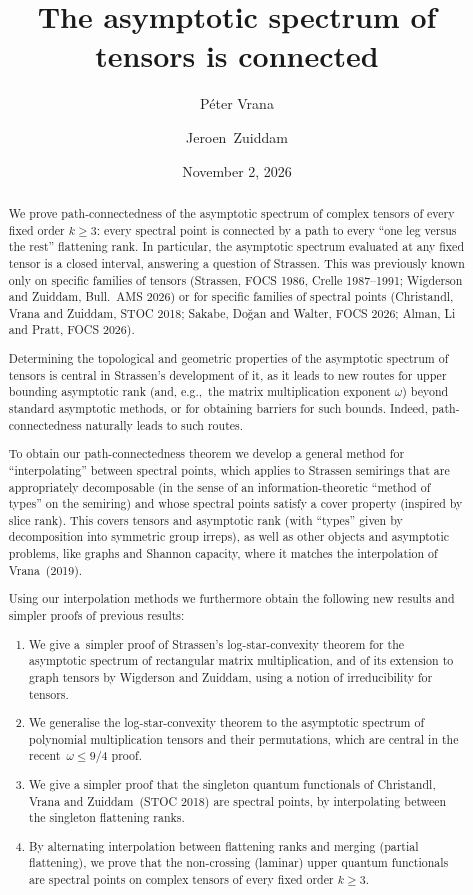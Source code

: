 \documentclass[11pt,letterpaper]{article}
\title{The asymptotic spectrum of tensors is connected}
\author[1]{P\'eter Vrana}
\author[2]{Jeroen~Zuiddam}
\affil[1]{Budapest University of Technology and Economics}
\affil[2]{University of Amsterdam}
\date{November 2, 2026}
\begin{document}
\maketitle

\begin{abstract}
We prove path-connectedness of the asymptotic spectrum of complex tensors of every fixed order $k \geq 3$: every spectral point is connected by a path to every ``one leg versus the rest'' flattening rank. In particular, the asymptotic spectrum evaluated at any fixed tensor is a closed interval, answering a question of Strassen. 
This was previously known only on specific families of tensors (Strassen, FOCS 1986, Crelle 1987--1991; Wigderson and Zuiddam, Bull.~AMS 2026) or for specific families of spectral points (Christandl, Vrana and Zuiddam, STOC 2018; Sakabe, Do\u{g}an and Walter, FOCS 2026; Alman, Li and Pratt, FOCS 2026). 

Determining the topological and geometric properties of the asymptotic spectrum of tensors is central in Strassen's development of it, as it leads to new routes for upper bounding asymptotic rank (and, e.g.,~the matrix multiplication exponent $\omega$) beyond standard asymptotic methods, or for obtaining barriers for such bounds. Indeed, path-connectedness naturally leads to such routes. 

To obtain our path-connectedness theorem we develop a general method for ``interpolating'' between spectral points, which applies to  Strassen semirings that are appropriately decomposable (in the sense of an information-theoretic ``method of types'' on the semiring) and whose spectral points satisfy a cover property (inspired by slice rank). This covers tensors and asymptotic rank (with ``types'' given by decomposition into symmetric group irreps), as well as other objects and asymptotic problems, like graphs and Shannon capacity, where it matches the interpolation of Vrana~(2019).

Using our interpolation methods we furthermore obtain the following new results and simpler proofs of previous results: \begin{enumerate}[(1)]
\item We give a~simpler proof of Strassen's log-star-convexity theorem for the asymptotic spectrum of rectangular matrix multiplication, and of its extension to graph tensors by Wigderson and Zuiddam, using a notion of irreducibility for tensors.
\item We generalise the log-star-convexity theorem to the asymptotic spectrum of polynomial multiplication tensors and their permutations, which are central in the recent~$\omega \leq 9/4$ proof.
\item We give a simpler proof that the singleton quantum functionals of Christandl, Vrana and Zuiddam~(STOC 2018) are spectral points, by interpolating between the singleton flattening ranks.
\item By alternating interpolation between flattening ranks and merging (partial flattening), we prove that the non-crossing (laminar) upper quantum functionals are spectral points on complex tensors of every fixed order $k \geq 3$.
\end{enumerate}


\end{abstract}
\end{document}
